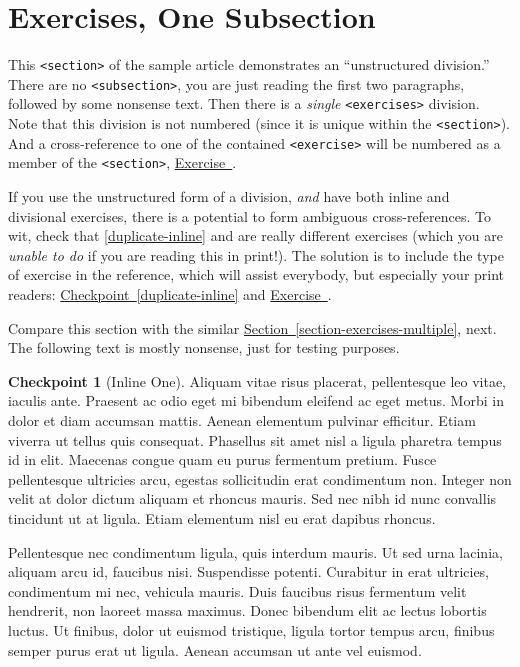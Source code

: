 \documentclass{amsart}
\theoremstyle{plain}%
\theoremstyle{definition}%
\newtheorem{inlineexercise}[theorem]{Checkpoint}
\theoremstyle{remark}%
\newcommand{\xreffont}{\relax}
\newcommand{\mono}[1]{\texttt{#1}}
\numberwithin{equation}{section}
\begin{document}
\section{Exercises, One Subsection}\label{section-exercises-single}%
This \mono{<section>} of the sample article demonstrates an ``unstructured division.''  There are no \mono{<subsection>}, you are just reading the first two paragraphs, followed by some nonsense text.  Then there is a \emph{single} \mono{<exercises>} division.  Note that this division is not numbered (since it is unique within the \mono{<section>}).  And a cross-reference to one of the contained \mono{<exercise>} will be numbered as a member of the \mono{<section>}, \hyperlink{exercise-challenging-one-unstructured}{Exercise~{\xreffont 36.4}}.%
\par
If you use the unstructured form of a division, \emph{and} have both inline and divisional exercises, there is a potential to form ambiguous cross-references.  To wit, check that \hyperref[duplicate-inline]{{\xreffont\ref{duplicate-inline}}} and \hyperlink{duplicate-divisional}{{\xreffont 36.2}} are really different exercises (which you are \emph{unable to do} if you are reading this in print!).  The solution is to include the type of exercise in the reference, which will assist everybody, but especially your print readers:  \hyperref[duplicate-inline]{Checkpoint~{\xreffont\ref{duplicate-inline}}} and \hyperlink{duplicate-divisional}{Exercise~{\xreffont 36.2}}.%
\par
Compare this section with the similar \hyperref[section-exercises-multiple]{Section~{\xreffont\ref{section-exercises-multiple}}}, next.  The following text is mostly nonsense, just for testing purposes.%
\begin{inlineexercise}[Inline One]\label{section-exercises-single-5}%
%
Aliquam vitae risus placerat, pellentesque leo vitae, iaculis ante. Praesent ac odio eget mi bibendum eleifend ac eget metus. Morbi in dolor et diam accumsan mattis. Aenean elementum pulvinar efficitur. Etiam viverra ut tellus quis consequat. Phasellus sit amet nisl a ligula pharetra tempus id in elit. Maecenas congue quam eu purus fermentum pretium. Fusce pellentesque ultricies arcu, egestas sollicitudin erat condimentum non. Integer non velit at dolor dictum aliquam et rhoncus mauris. Sed nec nibh id nunc convallis tincidunt ut at ligula. Etiam elementum nisl eu erat dapibus rhoncus.%
\end{inlineexercise}%
Pellentesque nec condimentum ligula, quis interdum mauris. Ut sed urna lacinia, aliquam arcu id, faucibus nisi. Suspendisse potenti. Curabitur in erat ultricies, condimentum mi nec, vehicula mauris. Duis faucibus risus fermentum velit hendrerit, non laoreet massa maximus. Donec bibendum elit ac lectus lobortis luctus. Ut finibus, dolor ut euismod tristique, ligula tortor tempus arcu, finibus semper purus erat ut ligula. Aenean accumsan ut ante vel euismod.%
\end{document}

